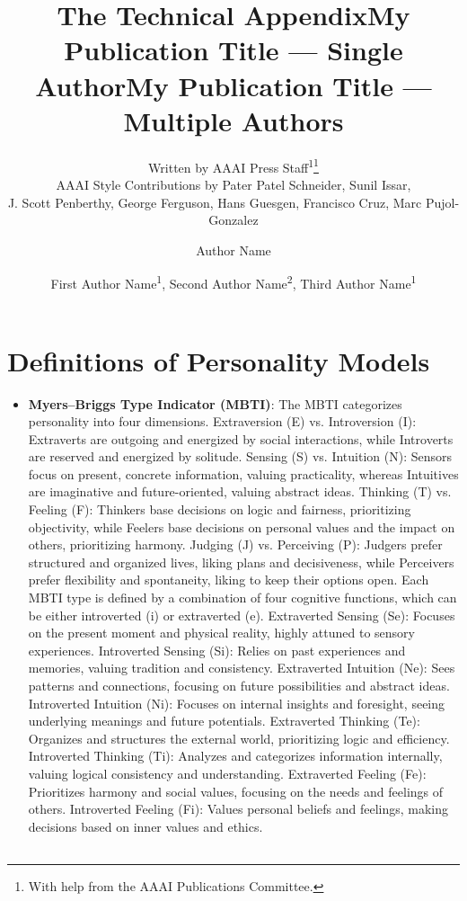 \documentclass[letterpaper]{article} %
\title{The Technical Appendix}
\author{
    Written by AAAI Press Staff\textsuperscript{\rm 1}\thanks{With help from the AAAI Publications Committee.}\\
    AAAI Style Contributions by Pater Patel Schneider,
    Sunil Issar,\\
    J. Scott Penberthy,
    George Ferguson,
    Hans Guesgen,
    Francisco Cruz\equalcontrib,
    Marc Pujol-Gonzalez\equalcontrib
}
\title{My Publication Title --- Single Author}
\author {
    Author Name
}
\title{My Publication Title --- Multiple Authors}
\author {
    First Author Name\textsuperscript{\rm 1},
    Second Author Name\textsuperscript{\rm 2},
    Third Author Name\textsuperscript{\rm 1}
}
\begin{document}
\maketitle


\section{Definitions of Personality Models}
\label{sec:appendixA}


\begin{itemize}
  \item \textbf{Myers–Briggs Type Indicator (MBTI)}: The MBTI categorizes personality into four dimensions. Extraversion (E) vs. Introversion (I): Extraverts are outgoing and energized by social interactions, while Introverts are reserved and energized by solitude. Sensing (S) vs. Intuition (N): Sensors focus on present, concrete information, valuing practicality, whereas Intuitives are imaginative and future-oriented, valuing abstract ideas. Thinking (T) vs. Feeling (F): Thinkers base decisions on logic and fairness, prioritizing objectivity, while Feelers base decisions on personal values and the impact on others, prioritizing harmony. Judging (J) vs. Perceiving (P): Judgers prefer structured and organized lives, liking plans and decisiveness, while Perceivers prefer flexibility and spontaneity, liking to keep their options open. Each MBTI type is defined by a combination of four cognitive functions, which can be either introverted (i) or extraverted (e). Extraverted Sensing (Se): Focuses on the present moment and physical reality, highly attuned to sensory experiences. Introverted Sensing (Si): Relies on past experiences and memories, valuing tradition and consistency. Extraverted Intuition (Ne): Sees patterns and connections, focusing on future possibilities and abstract ideas. Introverted Intuition (Ni): Focuses on internal insights and foresight, seeing underlying meanings and future potentials. Extraverted Thinking (Te): Organizes and structures the external world, prioritizing logic and efficiency. Introverted Thinking (Ti): Analyzes and categorizes information internally, valuing logical consistency and understanding. Extraverted Feeling (Fe): Prioritizes harmony and social values, focusing on the needs and feelings of others. Introverted Feeling (Fi): Values personal beliefs and feelings, making decisions based on inner values and ethics.
  \begin{table*}[ht]
    \centering
    \small
    \begin{tabular}{ll}

\end{tabular}
\end{table*}
\end{itemize}
\end{document}
